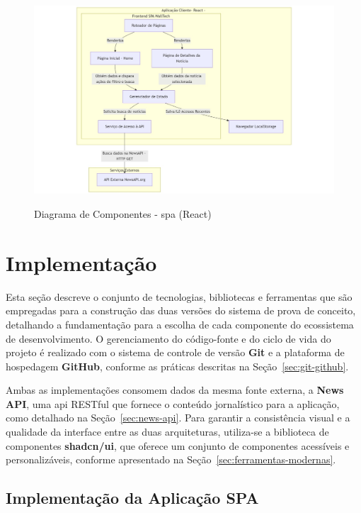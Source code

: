 \begin{figure}[H]
  \centering
  \caption{Diagrama de Componentes - \acrshort{spa} (React)}
  \includegraphics[width=1\textwidth]{media/component-diagram-react.jpeg}
  \label{fig:component-diagram-react}
\end{figure}



\section{Implementação}
\label{sec:implementacao}

Esta seção descreve o conjunto de tecnologias, bibliotecas e ferramentas que são empregadas para a construção das duas versões do sistema de prova de conceito, detalhando a fundamentação para a escolha de cada componente do ecossistema de desenvolvimento. O gerenciamento do código-fonte e do ciclo de vida do projeto é realizado com o sistema de controle de versão \textbf{Git} e a plataforma de hospedagem \textbf{GitHub}, conforme as práticas descritas na Seção~\ref{sec:git-github}.

Ambas as implementações consomem dados da mesma fonte externa, a \textbf{News API}, uma \acrshort{api} RESTful que fornece o conteúdo jornalístico para a aplicação, como detalhado na Seção~\ref{sec:news-api}. Para garantir a consistência visual e a qualidade da interface entre as duas arquiteturas, utiliza-se a biblioteca de componentes \textbf{shadcn/ui}, que oferece um conjunto de componentes acessíveis e personalizáveis, conforme apresentado na Seção~\ref{sec:ferramentas-modernas}.

\subsection{Implementação da Aplicação SPA}
\label{ssec:implementacao_spa}

